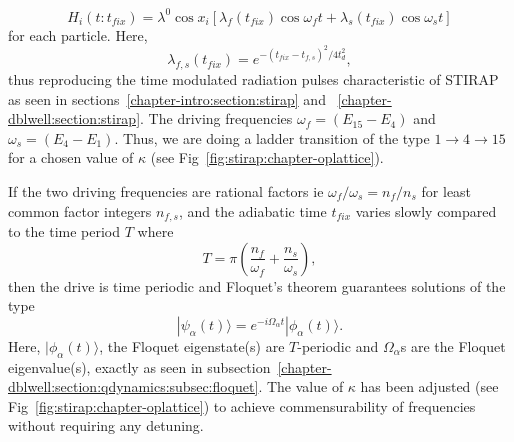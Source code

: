 \begin{equation}
H_i(t:t_{fix}) = \lambda^0  \cos{x_i} \left[ \lambda_f(t_{fix})\cos{\omega_f t} + \lambda_s(t_{fix}) \cos{\omega_s t}\right]
\end{equation}
for each particle. Here, 
\begin{equation}
 \lambda_{f,s}(t_{fix}) = e^{-(t_{fix}-t_{f,s})^2/4t^2_d},
 \label{eq:stirap:amp:chapter-oplattice}
\end{equation}
thus reproducing the time modulated radiation pulses characteristic of STIRAP as seen in sections~\ref{chapter-intro:section:stirap} and ~\ref{chapter-dblwell:section:stirap}. The driving frequencies $\omega_f=(E_{15}-E_4)$ and $\omega_s=(E_4-E_1)$. Thus, we are doing a ladder transition of the type $1\rightarrow 4 \rightarrow 15$ for a chosen value of $\kappa$ (see Fig~\ref{fig:stirap:chapter-oplattice}). 

If the two driving frequencies are rational factors ie $\omega_f/\omega_s = n_f/n_s$ for least common factor integers $n_{f,s}$, and the adiabatic time $t_{fix}$ varies slowly compared to the time period $T$ where
\begin{equation}
T=\pi \left(\frac{n_f}{\omega_f}+\frac{n_s}{\omega_s}\right),
\end{equation}
then the drive is time periodic and Floquet's theorem guarantees solutions of the type 
\begin{equation}
 |\psi_\alpha(t)\rangle=e^{-i\Omega_\alpha t}|\phi_\alpha(t)\rangle.
\end{equation}
Here, $|\phi_\alpha(t)\rangle$, the Floquet eigenstate(s) are $T$-periodic and $\Omega_\alpha$s are the Floquet eigenvalue(s), exactly as seen in  subsection~\ref{chapter-dblwell:section:qdynamics:subsec:floquet}. The value of $\kappa$ has been adjusted (see Fig~\ref{fig:stirap:chapter-oplattice}) to achieve commensurability of frequencies without requiring any detuning.

